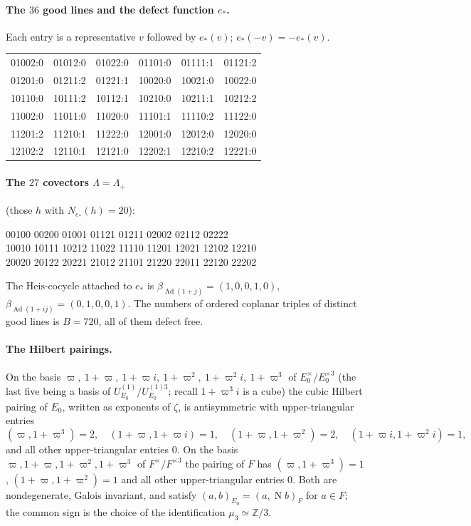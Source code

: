 \documentclass[11pt]{article}
\newcommand{\Z}{\mathbb Z}
\newcommand{\Nm}{\operatorname N}
\newcommand{\Ad}{\operatorname{Ad}}
\newcommand{\Heis}{\mathrm{Heis}}
\theoremstyle{plain}
\theoremstyle{definition}
\begin{document}
\paragraph{The $36$ good lines and the defect function $e_*$.}
Each entry is a representative $v$ followed by $e_*(v)$; $e_*(-v)=-e_*(v)$.
\begin{center}\small\ttfamily
\begin{tabular}{llllll}
01002:0&01012:0&01022:0&01101:0&01111:1&01121:2\\
01201:0&01211:2&01221:1&10020:0&10021:0&10022:0\\
10110:0&10111:2&10112:1&10210:0&10211:1&10212:2\\
11002:0&11011:0&11020:0&11101:1&11110:2&11122:0\\
11201:2&11210:1&11222:0&12001:0&12012:0&12020:0\\
12102:2&12110:1&12121:0&12202:1&12210:2&12221:0\\
\end{tabular}
\end{center}
\paragraph{The $27$ covectors $\Lambda=\Lambda_+$} (those $h$ with $N_{e_*}(h)=20$):
\begin{center}\small{} 00100 00200 01001 01121 01211 02002 02112 02222\\
10010 10111 10212 11022 11110 11201 12021 12102 12210\\
20020 20122 20221 21012 21101 21220 22011 22120 22202
\end{center}
The $\Heis$-cocycle attached to $e_*$ is $\beta_{\Ad(1+j)}=(1,0,0,1,0)$,
$\beta_{\Ad(1+ij)}=(0,1,0,0,1)$.  The numbers of ordered coplanar
triples of distinct good lines is $B=720$, all of them defect free.
\paragraph{The Hilbert pairings.}  On the basis
$\varpi,\ 1+\varpi,\ 1+\varpi i,\ 1+\varpi^2,\ 1+\varpi^2i,\ 1+\varpi^3$ of
$E_0^\times/E_0^{\times3}$ (the last five being a basis of
$U^{(1)}_{E_0}/U^{(1)3}_{E_0}$; recall $1+\varpi^3 i$ is a cube) the cubic
Hilbert pairing of $E_0$, written as exponents of $\zeta$, is
antisymmetric with upper-triangular entries
\[
 (\varpi,1+\varpi^3)=2,\quad (1+\varpi,1+\varpi i)=1,\quad (1+\varpi,1+\varpi^2)=2,\quad
 (1+\varpi i,1+\varpi^2 i)=1,
\]
and all other upper-triangular entries $0$.  On the basis
$\varpi,1+\varpi,1+\varpi^2,1+\varpi^3$ of $F^\times/F^{\times3}$ the pairing of $F$
has $(\varpi,1+\varpi^3)=1$, $(1+\varpi,1+\varpi^2)=1$ and all other
upper-triangular entries $0$.  Both are nondegenerate, Galois
invariant, and satisfy $(a,b)_{E_0}=(a,\Nm b)_F$ for $a\in F$; the common
sign is the choice of the identification $\mu_3\simeq\Z/3$.
\end{document}
